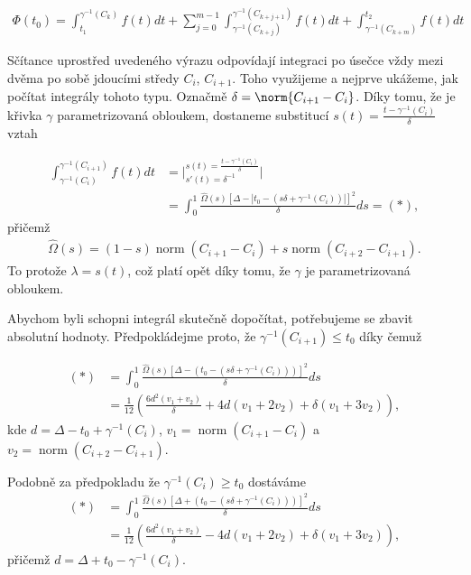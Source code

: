 \begin{align} \label{eq:integral_sum}
    \Phi(t_0) = \int_{t_1}^{\gamma^{-1}(C_k)} f(t) dt
        + \sum_{j=0}^{m - 1} \int_{\gamma^{-1}(C_{k + j})}^{\gamma^{-1}(C_{k + j + 1})} f(t) dt
        + \int_{\gamma^{-1}(C_{k + m})}^{t_2} f(t) dt
\end{align}

Sčítance uprostřed uvedeného výrazu odpovídají integraci po úsečce vždy mezi
dvěma po sobě jdoucími středy $ C_i $, $C_{i+1} $. Toho využijeme a nejprve ukážeme,
jak počítat integrály tohoto typu. Označmě $\delta = \norm{C_{i + 1} - C_i}$.
Díky tomu, že je křivka $ \gamma $ parametrizovaná
obloukem, dostaneme substitucí
$ s(t) = \frac{t - \gamma^{-1}(C_i)}{\delta} $ vztah

\begin{align*}
    \int_{\gamma^{-1}(C_{i})}^{\gamma^{-1}(C_{i + 1})} f(t) dt
    &= \bigg\rvert
        ^{s(t) = \frac{t - \gamma^{-1}(C_i)}{\delta}}
        _{s'(t) = \delta^{-1}} \bigg\lvert \\
    &= \int_{0}^{1}
        \frac{\widehat{\Omega}(s)
            \left[\Delta - \left| t_0 - (s \delta + \gamma^{-1}(C_i)) \right| \right]^2}
        {\delta} ds
    = (*),
\end{align*}
přičemž
\begin{align*}
    \widehat{\Omega}(s) = (1 - s) \operatorname{norm}(C_{i + 1} - C_i)
            + s \operatorname{norm}(C_{i + 2} - C_{i + 1}).
\end{align*}
To protože $ \lambda = s(t) $, což platí opět díky tomu, že $ \gamma $ je
parametrizovaná obloukem.

Abychom byli schopni integrál skutečně dopočítat, potřebujeme se zbavit absolutní
hodnoty. Předpokládejme proto, že $ \gamma^{-1}(C_{i + 1}) \leq t_0$ díky čemuž

\begin{align}
    (*) &= \int_{0}^{1}
        \frac{\widehat{\Omega}(s)
            \left[\Delta - (t_0 - (s \delta + \gamma^{-1}(C_i)) ) \right]^2}
        {\delta}
         ds \\
    &= \frac{1}{12} \left(
        \frac{6 d^2 (v_1+v_2 )}{\delta}
        + 4 d (v_1+2 v_2 )
        + \delta (v_1+3 v_2 ) \right), \label{eq:result_1}
\end{align}
kde $ d = \Delta - t_0 + \gamma^{-1}(C_i) $,
$ v_1 = \operatorname{norm}(C_{i + 1} - C_i) $ a
$ v_2 = \operatorname{norm}(C_{i + 2} - C_{i + 1})$.

Podobně za předpokladu že $ \gamma^{-1}(C_i) \geq t_0$ dostáváme
\begin{align}
    (*) &= \int_{0}^{1}
        \frac{\widehat{\Omega}(s)
            \left[\Delta + (t_0 - (s \delta + \gamma^{-1}(C_i)) ) \right]^2}
        {\delta}
         ds \\
    &= \frac{1}{12} \left(
        \frac{6 d^2 (v_1+v_2 )}{\delta}
        - 4 d (v_1+2 v_2 )
        + \delta (v_1+3 v_2 ) \right), \label{eq:result_2}
\end{align}
přičemž $ d = \Delta + t_0 - \gamma^{-1}(C_i) $.

